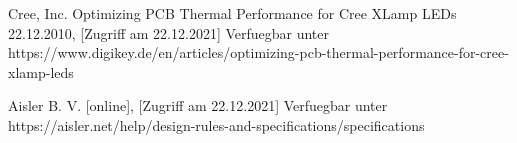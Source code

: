 \documentclass[10pt,a4paper,oneside,abstracton]{scrartcl}
\begin{document}
\begin{multicols}{2}
\begin{thebibliography}{9}
Cree, Inc. Optimizing PCB Thermal Performance for Cree XLamp LEDs 22.12.2010, [Zugriff am 22.12.2021] Verfuegbar unter https://www.digikey.de/en/articles/optimizing-pcb-thermal-performance-for-cree-xlamp-leds

Aisler B. V.  [online], [Zugriff am 22.12.2021] Verfuegbar unter https://aisler.net/help/design-rules-and-specifications/specifications




\end{thebibliography}

\end{multicols}
 
\end{document}
